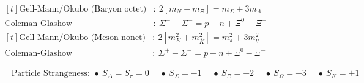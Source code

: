 \documentclass{article}
\begin{document}
\begin{landscape}
\vspace{15pt}
\(\begin{aligned}[t]
    \text{Gell-Mann/Okubo (Baryon octet)} & :\ 2[m_N + m_\Xi] = m_\Sigma+ 3m_\Lambda \\
    \text{Coleman-Glashow} & :\ \Sigma^+ - \Sigma^- = p - n + \Xi^0 - \Xi^-
\end{aligned}\)
\hspace{10pt}
\(\begin{aligned}[t]
    \text{Gell-Mann/Okubo (Meson nonet)} & :\ 2[m_K^2 + m_{\overline{K}}^2] = m_\pi^2 + 3m_\eta^2 \\
    \text{Coleman-Glashow} & :\ \Sigma^+ - \Sigma^- = p - n + \Xi^0 - \Xi^-
\end{aligned}\)

\vspace{10pt}
\hrulefill

\vspace{10pt}
\(\begin{aligned}
    & \text{Particle Strangeness}:\ \bullet\ S_\Delta = S_\pi = 0 
        \hspace{15pt} \bullet\ S_{\Sigma} = -1
        \hspace{15pt} \bullet\ S_{\Xi} = -2
        \hspace{15pt} \bullet\ S_\Omega = -3
        \hspace{15pt} \bullet\ S_K = \pm 1
\end{aligned}\)


\end{landscape}
\end{document}
